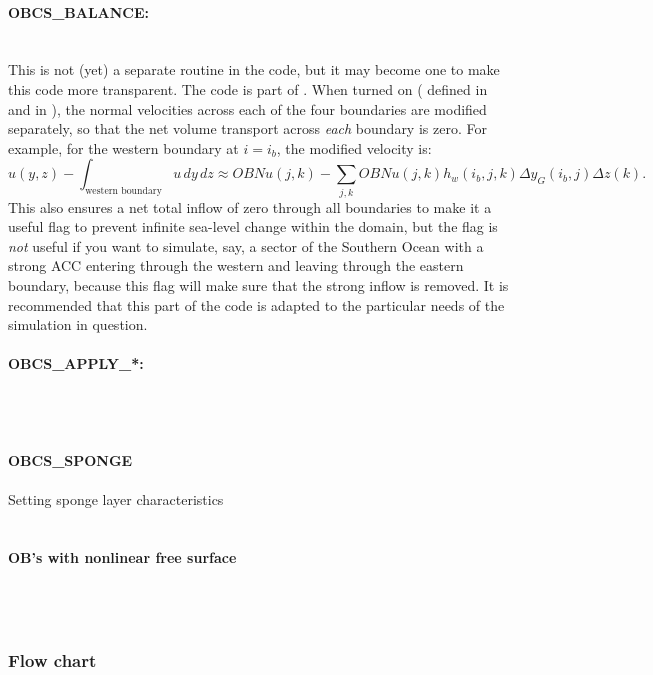 \paragraph{OBCS\_BALANCE:} ~ \\
%
This is not (yet) a separate routine in the code, but it may become
one to make this code more transparent. The code is part of
. When turned on (
defined in  and  in
), the normal velocities across each of
the four boundaries are modified separately, so that the net volume
transport across \emph{each} boundary is zero. For example, for the
western boundary at $i=i_{b}$, the modified velocity is:
\[
u(y,z) - \int_{\mbox{western boundary}}u\,dy\,dz \approx OBNu(j,k) - \sum_{j,k}
OBNu(j,k) h_{w}(i_{b},j,k)\Delta{y_G(i_{b},j)}\Delta{z(k)}.
\]
This also ensures a net total inflow of zero through all boundaries to
make it a useful flag to prevent infinite sea-level change within the
domain, but the flag is \emph{not} useful if you want to simulate,
say, a sector of the Southern Ocean with a strong ACC entering through
the western and leaving through the eastern boundary, because this
flag will make sure that the strong inflow is removed. It is
recommended that this part of the code is adapted to the particular
needs of the simulation in question.

\paragraph{OBCS\_APPLY\_*:} ~ \\
~

\paragraph{OBCS\_SPONGE} Setting sponge layer characteristics \\
%
~

\paragraph{OB's with nonlinear free surface} ~ \\
%
~



\subsubsection{Flow chart
\label{sec:pkg:obcs:flowchart}}


